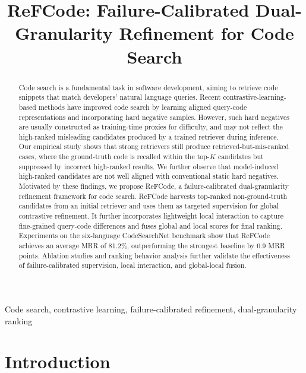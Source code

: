 \documentclass[10pt,conference]{IEEEtran}
\newcommand{\method}{ReFCode}
\begin{document}
\title{\method{}: Failure-Calibrated Dual-Granularity Refinement for Code Search}

\author{}

\maketitle

\begin{abstract}
Code search is a fundamental task in software development, aiming to retrieve code snippets that match developers' natural language queries. Recent contrastive-learning-based methods have improved code search by learning aligned query-code representations and incorporating hard negative samples. However, such hard negatives are usually constructed as training-time proxies for difficulty, and may not reflect the high-ranked misleading candidates produced by a trained retriever during inference. Our empirical study shows that strong retrievers still produce retrieved-but-mis-ranked cases, where the ground-truth code is recalled within the top-\(K\) candidates but suppressed by incorrect high-ranked results. We further observe that model-induced high-ranked candidates are not well aligned with conventional static hard negatives. Motivated by these findings, we propose ReFCode, a failure-calibrated dual-granularity refinement framework for code search. ReFCode harvests top-ranked non-ground-truth candidates from an initial retriever and uses them as targeted supervision for global contrastive refinement. It further incorporates lightweight local interaction to capture fine-grained query-code differences and fuses global and local scores for final ranking. Experiments on the six-language CodeSearchNet benchmark show that ReFCode achieves an average MRR of 81.2\%, outperforming the strongest baseline by 0.9 MRR points. Ablation studies and ranking behavior analysis further validate the effectiveness of failure-calibrated supervision, local interaction, and global-local fusion.
\end{abstract}

\begin{IEEEkeywords}
Code search, contrastive learning, failure-calibrated refinement, dual-granularity ranking
\end{IEEEkeywords}

\section{Introduction}
\end{document}
